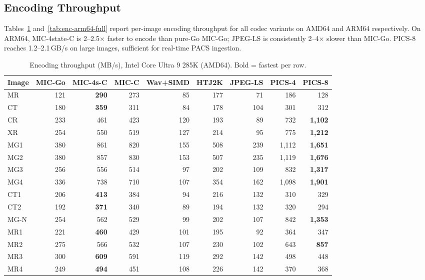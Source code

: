 \documentclass[journal]{IEEEtran}
\begin{document}
\subsection{Encoding Throughput}

Tables~\ref{tab:enc-amd64} and~\ref{tab:enc-arm64-full} report per-image
encoding throughput for all codec variants on AMD64 and ARM64 respectively.
On ARM64, MIC-4state-C is 2--2.5$\times$ faster to encode than pure-Go
MIC-Go; JPEG-LS is consistently 2--4$\times$ slower than MIC-Go. PICS-8
reaches 1.2--2.1\,GB/s on large images, sufficient for real-time PACS
ingestion.

\begin{table}[htbp]
\centering
\caption{Encoding throughput (MB/s), Intel Core Ultra 9 285K (AMD64). Bold =
fastest per row.}
\label{tab:enc-amd64}
\scriptsize
\begin{tabular}{lrrrrrrrr}
\toprule
Image & MIC-Go & MIC-4s-C & MIC-C & Wav+SIMD & HTJ2K & JPEG-LS & PICS-4 & PICS-8 \\
\midrule
MR  & 121 & \textbf{290} & 273 & 85 & 177 & 71 & 186 & 128 \\
CT  & 180 & \textbf{359} & 311 & 84 & 178 & 104 & 301 & 312 \\
CR  & 233 & 461 & 423 & 120 & 193 & 89 & 732 & \textbf{1,102} \\
XR  & 254 & 550 & 519 & 127 & 214 & 95 & 775 & \textbf{1,212} \\
MG1 & 380 & 861 & 820 & 155 & 508 & 239 & 1,112 & \textbf{1,651} \\
MG2 & 380 & 857 & 830 & 153 & 507 & 235 & 1,119 & \textbf{1,676} \\
MG3 & 256 & 556 & 514 & 97 & 202 & 109 & 832 & \textbf{1,317} \\
MG4 & 336 & 738 & 710 & 107 & 354 & 162 & 1,098 & \textbf{1,901} \\
CT1 & 206 & \textbf{413} & 384 & 94 & 216 & 132 & 310 & 329 \\
CT2 & 192 & \textbf{371} & 340 & 89 & 194 & 132 & 320 & 294 \\
MG-N & 254 & 562 & 529 & 99 & 202 & 107 & 842 & \textbf{1,353} \\
MR1 & 221 & \textbf{460} & 429 & 101 & 195 & 92 & 364 & 347 \\
MR2 & 275 & 566 & 532 & 107 & 230 & 102 & 643 & \textbf{857} \\
MR3 & 300 & \textbf{609} & 591 & 119 & 292 & 142 & 498 & 448 \\
MR4 & 249 & \textbf{494} & 451 & 108 & 226 & 142 & 370 & 368 \\

\end{tabular}
\end{table}
\end{document}

